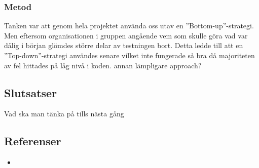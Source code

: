 	\subsubsection{Metod}
	Tanken var att genom hela projektet använda oss utav en ''Bottom-up''-strategi. Men eftersom organisationen i gruppen angående vem som skulle göra vad var dålig i början glömdes större delar av testningen bort. Detta ledde till att en ''Top-down''-strategi användes senare vilket inte fungerade så bra då majoriteten av fel hittades på låg nivå i koden.
	annan lämpligare approach?	
	
	\subsection{Slutsatser}
	Vad ska man tänka på tills nästa gång
	
	\subsection{Referenser}
	\begin{itemize}
	\item{}
	\end{itemize}
	
